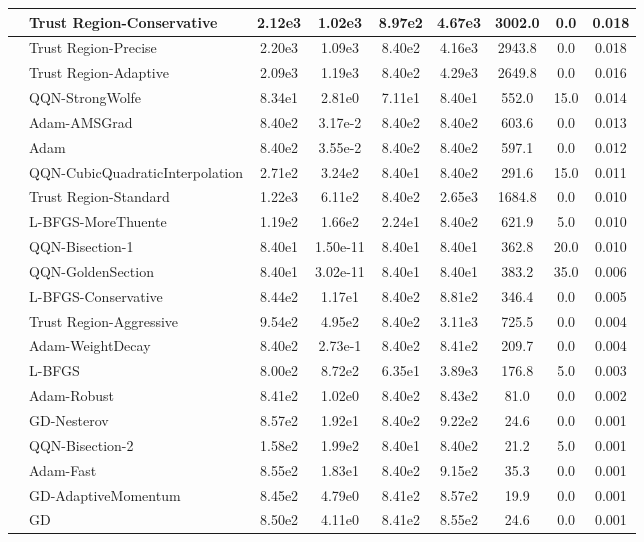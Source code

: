 \documentclass{article}
\begin{document}
\begin{longtable}{|l|l|c|c|c|c|c|c|c|}
\hline
 & Trust Region-Conservative & 2.12e3 & 1.02e3 & 8.97e2 & 4.67e3 & 3002.0 & 0.0 & 0.018 \\
\hline
 & Trust Region-Precise & 2.20e3 & 1.09e3 & 8.40e2 & 4.16e3 & 2943.8 & 0.0 & 0.018 \\
\hline
 & Trust Region-Adaptive & 2.09e3 & 1.19e3 & 8.40e2 & 4.29e3 & 2649.8 & 0.0 & 0.016 \\
\hline
 & QQN-StrongWolfe & 8.34e1 & 2.81e0 & 7.11e1 & 8.40e1 & 552.0 & 15.0 & 0.014 \\
\hline
 & Adam-AMSGrad & 8.40e2 & 3.17e-2 & 8.40e2 & 8.40e2 & 603.6 & 0.0 & 0.013 \\
\hline
 & Adam & 8.40e2 & 3.55e-2 & 8.40e2 & 8.40e2 & 597.1 & 0.0 & 0.012 \\
\hline
 & QQN-CubicQuadraticInterpolation & 2.71e2 & 3.24e2 & 8.40e1 & 8.40e2 & 291.6 & 15.0 & 0.011 \\
\hline
 & Trust Region-Standard & 1.22e3 & 6.11e2 & 8.40e2 & 2.65e3 & 1684.8 & 0.0 & 0.010 \\
\hline
 & L-BFGS-MoreThuente & 1.19e2 & 1.66e2 & 2.24e1 & 8.40e2 & 621.9 & 5.0 & 0.010 \\
\hline
 & QQN-Bisection-1 & 8.40e1 & 1.50e-11 & 8.40e1 & 8.40e1 & 362.8 & 20.0 & 0.010 \\
\hline
 & QQN-GoldenSection & 8.40e1 & 3.02e-11 & 8.40e1 & 8.40e1 & 383.2 & 35.0 & 0.006 \\
\hline
 & L-BFGS-Conservative & 8.44e2 & 1.17e1 & 8.40e2 & 8.81e2 & 346.4 & 0.0 & 0.005 \\
\hline
 & Trust Region-Aggressive & 9.54e2 & 4.95e2 & 8.40e2 & 3.11e3 & 725.5 & 0.0 & 0.004 \\
\hline
 & Adam-WeightDecay & 8.40e2 & 2.73e-1 & 8.40e2 & 8.41e2 & 209.7 & 0.0 & 0.004 \\
\hline
 & L-BFGS & 8.00e2 & 8.72e2 & 6.35e1 & 3.89e3 & 176.8 & 5.0 & 0.003 \\
\hline
 & Adam-Robust & 8.41e2 & 1.02e0 & 8.40e2 & 8.43e2 & 81.0 & 0.0 & 0.002 \\
\hline
 & GD-Nesterov & 8.57e2 & 1.92e1 & 8.40e2 & 9.22e2 & 24.6 & 0.0 & 0.001 \\
\hline
 & QQN-Bisection-2 & 1.58e2 & 1.99e2 & 8.40e1 & 8.40e2 & 21.2 & 5.0 & 0.001 \\
\hline
 & Adam-Fast & 8.55e2 & 1.83e1 & 8.40e2 & 9.15e2 & 35.3 & 0.0 & 0.001 \\
\hline
 & GD-AdaptiveMomentum & 8.45e2 & 4.79e0 & 8.41e2 & 8.57e2 & 19.9 & 0.0 & 0.001 \\
\hline
 & GD & 8.50e2 & 4.11e0 & 8.41e2 & 8.55e2 & 24.6 & 0.0 & 0.001 \\

\end{longtable}
\end{document}
